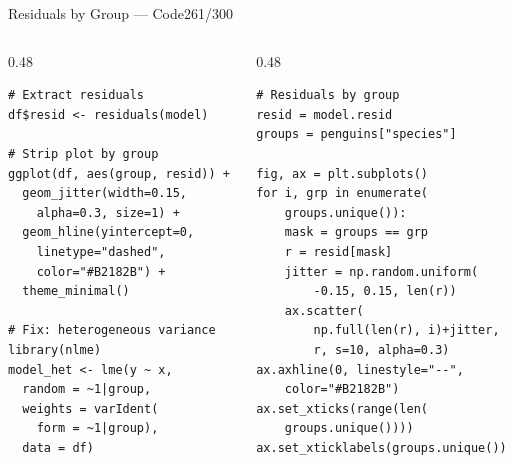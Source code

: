 \documentclass[10pt]{beamer}
\newcommand{\smark}[1]{\hfill{\scriptsize\color{codegray}#1}}
\begin{document}
\begin{frame}[fragile]{Residuals by Group --- Code}\smark{261/300}
\begin{columns}[T]
\begin{column}{0.48\textwidth}
\begin{lstlisting}[style=Rstyle]
# Extract residuals
df$resid <- residuals(model)

# Strip plot by group
ggplot(df, aes(group, resid)) +
  geom_jitter(width=0.15,
    alpha=0.3, size=1) +
  geom_hline(yintercept=0,
    linetype="dashed",
    color="#B2182B") +
  theme_minimal()

# Fix: heterogeneous variance
library(nlme)
model_het <- lme(y ~ x,
  random = ~1|group,
  weights = varIdent(
    form = ~1|group),
  data = df)
\end{lstlisting}
\end{column}
\begin{column}{0.48\textwidth}
\begin{lstlisting}[style=Pystyle]
# Residuals by group
resid = model.resid
groups = penguins["species"]

fig, ax = plt.subplots()
for i, grp in enumerate(
    groups.unique()):
    mask = groups == grp
    r = resid[mask]
    jitter = np.random.uniform(
        -0.15, 0.15, len(r))
    ax.scatter(
        np.full(len(r), i)+jitter,
        r, s=10, alpha=0.3)
ax.axhline(0, linestyle="--",
    color="#B2182B")
ax.set_xticks(range(len(
    groups.unique())))
ax.set_xticklabels(groups.unique())
\end{lstlisting}
\end{column}
\end{columns}
\end{frame}
\end{document}
